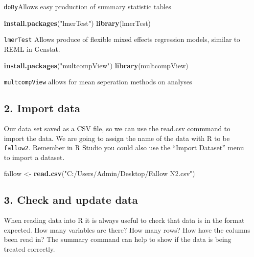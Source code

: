 \documentclass[]{book}
\newenvironment{Shaded}{\begin{snugshade}}{\end{snugshade}}
\newcommand{\KeywordTok}[1]{\textcolor[rgb]{0.13,0.29,0.53}{\textbf{#1}}}
\newcommand{\StringTok}[1]{\textcolor[rgb]{0.31,0.60,0.02}{#1}}
\newcommand{\NormalTok}[1]{#1}
\theoremstyle{definition}
\theoremstyle{definition}
\theoremstyle{definition}
\theoremstyle{remark}
\begin{document}
\texttt{doBy}Allows easy production of summary statistic tables

\begin{Shaded}
\begin{Highlighting}[]
\KeywordTok{install.packages}\NormalTok{(}\StringTok{"lmerTest"}\NormalTok{)}
\KeywordTok{library}\NormalTok{(lmerTest)}
\end{Highlighting}
\end{Shaded}

\texttt{lmerTest} Allows produce of flexible mixed effects regression
models, similar to REML in Genstat.

\begin{Shaded}
\begin{Highlighting}[]
\KeywordTok{install.packages}\NormalTok{(}\StringTok{"multcompView"}\NormalTok{)}
\KeywordTok{library}\NormalTok{(multcompView)}
\end{Highlighting}
\end{Shaded}

\texttt{multcompView} allows for mean seperation methods on analyses

\subsection{2. Import data}\label{import-data-2}

Our data set saved as a CSV file, so we can use the read.csv commmand to
import the data. We are going to assign the name of the data with R to
be \texttt{fallow2}. Remember in R Studio you could also use the
``Import Dataset'' menu to import a dataset.

\begin{Shaded}
\begin{Highlighting}[]
\NormalTok{fallow <-}\StringTok{ }\KeywordTok{read.csv}\NormalTok{(}\StringTok{"C:/Users/Admin/Desktop/Fallow N2.csv"}\NormalTok{)}
\end{Highlighting}
\end{Shaded}

\subsection{3. Check and update data}\label{check-and-update-data-2}

When reading data into R it is always useful to check that data is in
the format expected. How many variables are there? How many rows? How
have the columns been read in? The summary command can help to show if
the data is being treated correctly.
\end{document}
